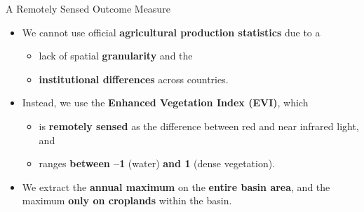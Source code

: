 \documentclass[aspectratio=169,11pt,dvipsnames, handout]{beamer}
\begin{document}
\begin{frame}{A Remotely Sensed Outcome Measure}
\begin{itemize}
\item We cannot use official \textbf{agricultural production statistics} due to a 
\vspace{0.5em}
        \begin{itemize}
            \item lack of spatial \textbf{granularity} and the
            \vspace{0.25em}
            \item \textbf{institutional differences} across countries.
        \end{itemize}
        \vspace{1em}
\item Instead, we use the \colorbox{ForestGreen!30}{\bfseries Enhanced Vegetation Index (EVI)}, which
\vspace{0.5em}
\begin{itemize}
    \item is \textbf{remotely sensed} as the difference between red and near infrared light, and
    \vspace{0.25em}
    \item ranges \textbf{between –1} (water) \textbf{and 1} (dense vegetation).
\end{itemize}
\vspace{0.5em}
\item We extract the \textbf{annual maximum} on the  \colorbox{ForestGreen!20}{\textbf{entire basin area}}, and the maximum  \colorbox{ForestGreen!20}{\textbf{only on croplands}} within the basin.
\end{itemize}
\end{frame}


\end{document}
